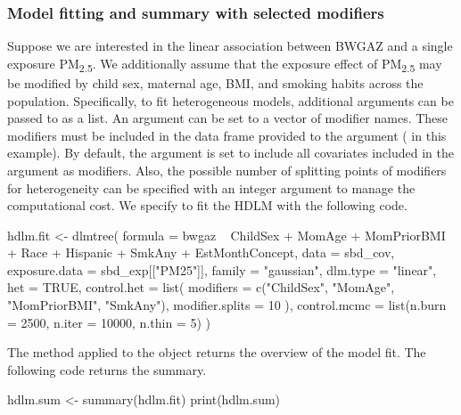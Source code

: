 \subsubsection{Model fitting and summary with selected modifiers}
Suppose we are interested in the linear association between BWGAZ and a single exposure PM\textsubscript{2.5}. We additionally assume that the exposure effect of PM\textsubscript{2.5} may be modified by child sex, maternal age, BMI, and smoking habits across the population. Specifically, to fit heterogeneous models, additional arguments can be passed to  as a list. An argument  can be set to a vector of modifier names. These modifiers must be included in the data frame provided to the  argument ( in this example). By default, the argument is set to include all covariates included in the  argument as modifiers. Also, the possible number of splitting points of modifiers for heterogeneity can be specified with an integer argument  to manage the computational cost. We specify  to fit the HDLM with the following code.

\begin{example}
hdlm.fit <- dlmtree(
    formula = bwgaz ~ ChildSex + MomAge + MomPriorBMI +
                        Race + Hispanic + SmkAny + EstMonthConcept,
    data = sbd_cov,
    exposure.data = sbd_exp[["PM25"]],
    family = "gaussian",
    dlm.type = "linear",
    het = TRUE,
    control.het = list(
        modifiers = c("ChildSex", "MomAge", "MomPriorBMI", "SmkAny"),
        modifier.splits = 10
    ),
    control.mcmc = list(n.burn = 2500, n.iter = 10000, n.thin = 5)
)
\end{example}
The  method applied to the object  returns the overview of the model fit. The following code returns the summary.

\begin{example}
hdlm.sum <- summary(hdlm.fit)
print(hdlm.sum)
\end{example}

